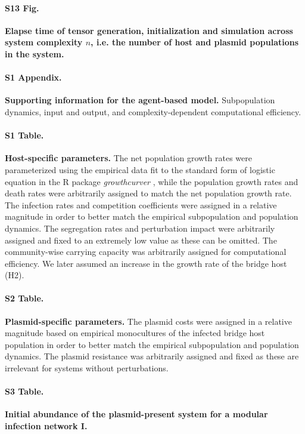 \documentclass[10pt,letterpaper]{article}
\begin{document}
\paragraph*{S13 Fig.}
\label{S13_Fig}
{\bf Elapse time of tensor generation, initialization and simulation across system complexity $n$, i.e. the number of host and plasmid populations in the system.}

\paragraph*{S1 Appendix.}
\label{S1_Appendix}
{\bf Supporting information for the agent-based model.} Subpopulation dynamics, input and output, and complexity-dependent computational efficiency.

\paragraph*{S1 Table.}
\label{S1_Table}
{\bf Host-specific parameters.} The net population growth rates were parameterized using the empirical data fit to the standard form of logistic equation in the R package \textit{growthcurver} \cite{Sprouffske2016-hl}, while the population growth rates and death rates were arbitrarily assigned to match the net population growth rate. The infection rates and competition coefficients were assigned in a relative magnitude in order to better match the empirical subpopulation and population dynamics. The segregation rates and perturbation impact were arbitrarily assigned and fixed to an extremely low value as these can be omitted. The community-wise carrying capacity was arbitrarily assigned for computational efficiency. We later assumed an increase in the growth rate of the bridge host (H2).

\paragraph*{S2 Table.}
\label{S2_Table}
{\bf Plasmid-specific parameters.} The plasmid costs were assigned in a relative magnitude based on empirical monocultures of the infected bridge host population in order to better match the empirical subpopulation and population dynamics. The plasmid resistance was arbitrarily assigned and fixed as these are irrelevant for systems without perturbations.

\paragraph*{S3 Table.}
\label{S3_Table}
{\bf Initial abundance of the plasmid-present system for a modular infection network \textbf{I}.}
\end{document}
